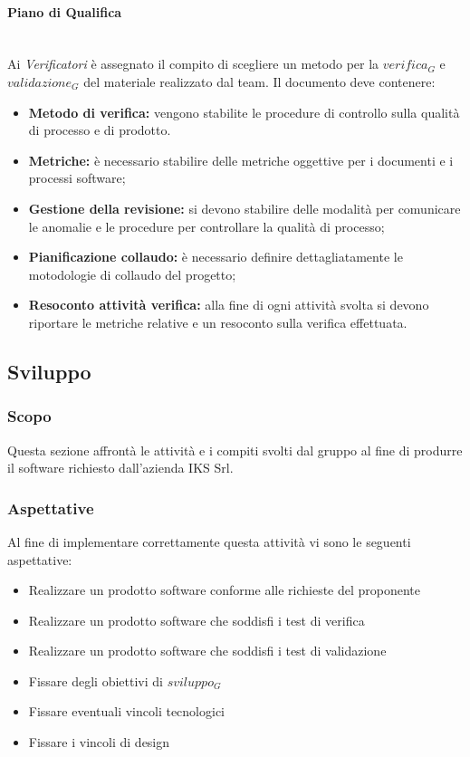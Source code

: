 		\paragraph{Piano di Qualifica} \mbox{} \\
		Ai \emph{Verificatori} è assegnato il compito di scegliere un metodo per la $verifica_G$ e $validazione_G$ del materiale realizzato dal team.
		Il documento deve contenere:
		\begin{itemize}
		\item \textbf{Metodo di verifica:} vengono stabilite le procedure di controllo sulla qualità di processo e di prodotto. 
		\item \textbf{Metriche:} è necessario stabilire delle metriche oggettive per i documenti e i processi software;
		\item \textbf{Gestione della revisione:} si devono stabilire delle modalità per comunicare le anomalie e le procedure per controllare la qualità di processo;
		\item \textbf{Pianificazione collaudo:} è necessario definire dettagliatamente le motodologie di collaudo del progetto;
		\item \textbf{Resoconto attività verifica:} alla fine di ogni attività svolta si devono riportare le metriche relative e un resoconto sulla verifica effettuata.
		\end{itemize}
	
\subsection{Sviluppo}
	\subsubsection{Scopo}
	Questa sezione affrontà le attività e i compiti svolti dal gruppo al fine di produrre il software richiesto dall'azienda IKS Srl.
	
	\subsubsection{Aspettative}
	Al fine di implementare correttamente questa attività vi sono le seguenti aspettative:
	\begin{itemize}
		\item Realizzare un prodotto software conforme alle richieste del proponente
		\item Realizzare un prodotto software che soddisfi i test di verifica
		\item Realizzare un prodotto software che soddisfi i test di validazione
		\item Fissare degli obiettivi di $sviluppo_G$
		\item Fissare eventuali vincoli tecnologici
		\item Fissare i vincoli di design
	\end{itemize}
	
